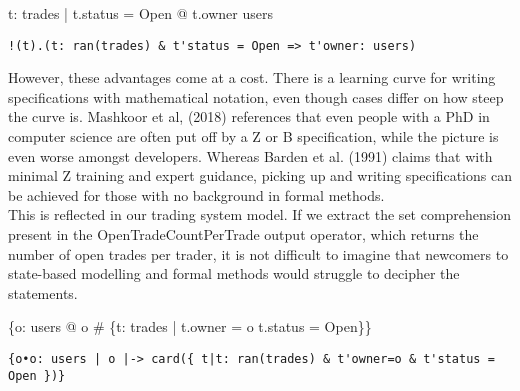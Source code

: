 \documentclass{article}
\begin{document}
\begin{zed}
\forall t: \ran trades | t.status = Open @ t.owner \in users \\ 
\end{zed}

\begin{verbatim}
!(t).(t: ran(trades) & t'status = Open => t'owner: users)
\end{verbatim}
\pagebreak

\hspace{-0.68cm} However, these advantages come at a cost. There is a learning curve for writing specifications with mathematical notation, even though cases differ on how steep the curve is. Mashkoor et al, (2018) references that even people with a PhD in computer science are often put off by a Z or B specification, while the picture is even worse amongst developers. Whereas Barden et al. (1991) claims that with minimal Z training and expert guidance, picking up and writing specifications can be achieved for those with no background in formal methods. \\
\newline
\hspace{-0.68cm} This is reflected in our trading system model. If we extract the set comprehension present in the OpenTradeCountPerTrade output operator, which returns the number of open trades per trader, it is not difficult to imagine that newcomers to state-based modelling and formal methods would struggle to decipher the statements.

\begin{zed}
\{o: users @ o \mapsto \# \{t: \ran trades | t.owner = o \land t.status = Open\}\}
\end{zed}

\begin{verbatim}
{o•o: users | o |-> card({ t|t: ran(trades) & t'owner=o & t'status = Open })}
\end{verbatim}
\end{document}
